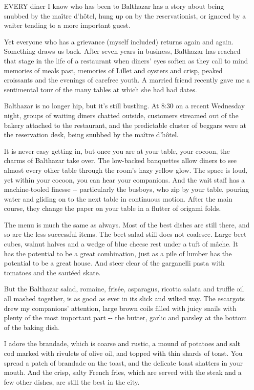 EVERY diner I know who has been to Balthazar has a story about being
snubbed by the maître d'hôtel, hung up on by the reservationist, or
ignored by a waiter tending to a more important guest.

Yet everyone who has a grievance (myself included) returns again and
again. Something draws us back. After seven years in business, Balthazar
has reached that stage in the life of a restaurant when diners' eyes
soften as they call to mind memories of meals past, memories of Lillet
and oysters and crisp, peaked croissants and the evenings of carefree
youth. A married friend recently gave me a sentimental tour of the many
tables at which she had had dates.

Balthazar is no longer hip, but it's still bustling. At 8:30 on a recent
Wednesday night, groups of waiting diners chatted outside, customers
streamed out of the bakery attached to the restaurant, and the
predictable cluster of beggars were at the reservation desk, being
snubbed by the maître d'hôtel.

It is never easy getting in, but once you are at your table, your
cocoon, the charms of Balthazar take over. The low-backed banquettes
allow diners to see almost every other table through the room's hazy
yellow glow. The space is loud, yet within your cocoon, you can hear
your companions. And the wait staff has a machine-tooled finesse -\/-
particularly the busboys, who zip by your table, pouring water and
gliding on to the next table in continuous motion. After the main
course, they change the paper on your table in a flutter of origami
folds.

The menu is much the same as always. Most of the best dishes are still
there, and so are the less successful items. The beet salad still does
not coalesce. Large beet cubes, walnut halves and a wedge of blue cheese
rest under a tuft of mâche. It has the potential to be a great
combination, just as a pile of lumber has the potential to be a great
house. And steer clear of the garganelli pasta with tomatoes and the
sautéed skate.

But the Balthazar salad, romaine, frisée, asparagus, ricotta salata and
truffle oil all mashed together, is as good as ever in its slick and
wilted way. The escargots drew my companions' attention, large brown
coils filled with juicy snails with plenty of the most important part
-\/- the butter, garlic and parsley at the bottom of the baking dish.

I adore the brandade, which is coarse and rustic, a mound of potatoes
and salt cod marked with rivulets of olive oil, and topped with thin
shards of toast. You spread a patch of brandade on the toast, and the
delicate toast shatters in your mouth. And the crisp, salty French
fries, which are served with the steak and a few other dishes, are still
the best in the city.

